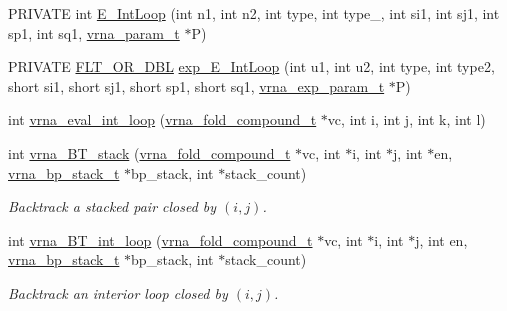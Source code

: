 \begin{DoxyCompactItemize}
\item 
P\+R\+I\+V\+A\+TE int \hyperlink{group__loops_gaafbc187b7f78e8e82afb77dd6f3b8fc5}{E\+\_\+\+Int\+Loop} (int n1, int n2, int type, int type\+\_, int si1, int sj1, int sp1, int sq1, \hyperlink{group__energy__parameters_ga8a69ca7d787e4fd6079914f5343a1f35}{vrna\+\_\+param\+\_\+t} $\ast$P)
\item 
P\+R\+I\+V\+A\+TE \hyperlink{group__data__structures_ga31125aeace516926bf7f251f759b6126}{F\+L\+T\+\_\+\+O\+R\+\_\+\+D\+BL} \hyperlink{group__loops_ga95de54d8a2a17645a95e0f34e189d9c9}{exp\+\_\+\+E\+\_\+\+Int\+Loop} (int u1, int u2, int type, int type2, short si1, short sj1, short sp1, short sq1, \hyperlink{group__energy__parameters_ga01d8b92fe734df8d79a6169482c7d8d8}{vrna\+\_\+exp\+\_\+param\+\_\+t} $\ast$P)
\item 
int \hyperlink{group__loops_ga018f1314dbbae42fdd27c94670b61721}{vrna\+\_\+eval\+\_\+int\+\_\+loop} (\hyperlink{group__fold__compound_ga1b0cef17fd40466cef5968eaeeff6166}{vrna\+\_\+fold\+\_\+compound\+\_\+t} $\ast$vc, int i, int j, int k, int l)
\item 
int \hyperlink{group__loops_gad320d5d721e33bed120168213d8f45e5}{vrna\+\_\+\+B\+T\+\_\+stack} (\hyperlink{group__fold__compound_ga1b0cef17fd40466cef5968eaeeff6166}{vrna\+\_\+fold\+\_\+compound\+\_\+t} $\ast$vc, int $\ast$i, int $\ast$j, int $\ast$en, \hyperlink{group__data__structures_gaa651bda42e7692f08cb603cd6834b0ee}{vrna\+\_\+bp\+\_\+stack\+\_\+t} $\ast$bp\+\_\+stack, int $\ast$stack\+\_\+count)\hypertarget{group__loops_gad320d5d721e33bed120168213d8f45e5}{}\label{group__loops_gad320d5d721e33bed120168213d8f45e5}

\begin{DoxyCompactList}\small\item\em Backtrack a stacked pair closed by $ (i,j) $. \end{DoxyCompactList}\item 
int \hyperlink{group__loops_ga849b7dc373b6c0b029672e16a7e52053}{vrna\+\_\+\+B\+T\+\_\+int\+\_\+loop} (\hyperlink{group__fold__compound_ga1b0cef17fd40466cef5968eaeeff6166}{vrna\+\_\+fold\+\_\+compound\+\_\+t} $\ast$vc, int $\ast$i, int $\ast$j, int en, \hyperlink{group__data__structures_gaa651bda42e7692f08cb603cd6834b0ee}{vrna\+\_\+bp\+\_\+stack\+\_\+t} $\ast$bp\+\_\+stack, int $\ast$stack\+\_\+count)\hypertarget{group__loops_ga849b7dc373b6c0b029672e16a7e52053}{}\label{group__loops_ga849b7dc373b6c0b029672e16a7e52053}

\begin{DoxyCompactList}\small\item\em Backtrack an interior loop closed by $ (i,j) $. \end{DoxyCompactList}\end{DoxyCompactItemize}


